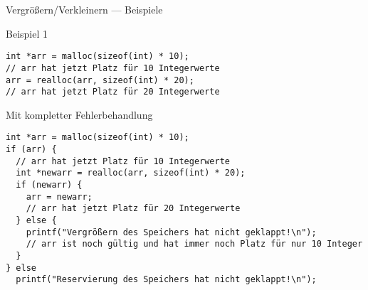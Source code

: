 \documentclass[presentation]{beamer}
\begin{document}
\begin{frame}[label={sec:org6ca7db1},fragile]{Vergrößern/Verkleinern  --- Beispiele}
 \begin{block}{Beispiel 1}
\begin{verbatim}
int *arr = malloc(sizeof(int) * 10);
// arr hat jetzt Platz für 10 Integerwerte
arr = realloc(arr, sizeof(int) * 20);
// arr hat jetzt Platz für 20 Integerwerte
\end{verbatim}
\end{block}
\begin{block}{Mit kompletter Fehlerbehandlung}
\begin{verbatim}
int *arr = malloc(sizeof(int) * 10);
if (arr) {
  // arr hat jetzt Platz für 10 Integerwerte
  int *newarr = realloc(arr, sizeof(int) * 20);
  if (newarr) {
    arr = newarr;
    // arr hat jetzt Platz für 20 Integerwerte
  } else {
    printf("Vergrößern des Speichers hat nicht geklappt!\n");
    // arr ist noch gültig und hat immer noch Platz für nur 10 Integer
  }
} else
  printf("Reservierung des Speichers hat nicht geklappt!\n");
\end{verbatim}
\end{block}
\end{frame}
\end{document}
